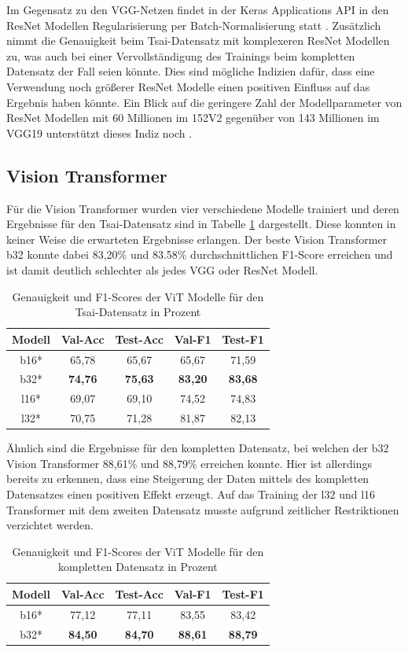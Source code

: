 \documentclass[twoside,a4paper]{IEEEtran}
\begin{document}
Im Gegensatz zu den VGG-Netzen findet in der Keras Applications API in den ResNet Modellen Regularisierung per Batch-Normalisierung statt \cite{resnet_keras}. Zusätzlich nimmt die Genauigkeit beim Tsai-Datensatz mit komplexeren ResNet Modellen zu, was auch bei einer Vervollständigung des Trainings beim kompletten Datensatz der Fall seien könnte. Dies sind mögliche Indizien dafür, dass eine Verwendung noch größerer ResNet Modelle einen positiven Einfluss auf das Ergebnis haben könnte. Ein Blick auf die geringere Zahl der Modellparameter von ResNet Modellen mit 60 Millionen im 152V2 gegenüber von 143 Millionen im VGG19 unterstützt dieses Indiz noch \cite{keras_app}.
\subsection{Vision Transformer}
Für die Vision Transformer wurden vier verschiedene Modelle trainiert und deren Ergebnisse für den Tsai-Datensatz sind in Tabelle \ref{vit_ergebnis_tsai} dargestellt. Diese konnten in keiner Weise die erwarteten Ergebnisse erlangen. Der beste Vision Transformer b32 konnte dabei 83,20\% und 83.58\% durchschnittlichen F1-Score erreichen und ist damit deutlich schlechter als jedes VGG oder ResNet Modell.
\begin{table}[!htb]
	\caption{Genauigkeit und F1-Scores der ViT Modelle für den Tsai-Datensatz in Prozent}
	\label{vit_ergebnis_tsai}
	\centering
	\begin{tabular}{|c|c|c|c|c|}
		\hline
		Modell & Val-Acc & Test-Acc & Val-F1 & Test-F1\\
		\hline
		\hline
		b16* & 65,78 & 65,67 & 65,67 & 71,59\\
		\hline
		b32* & \textbf{74,76} & \textbf{75,63} & \textbf{83,20} & \textbf{83,68}\\
		\hline
		l16* & 69,07 & 69,10 & 74,52 & 74,83\\
		\hline
		l32* & 70,75 & 71,28 & 81,87 & 82,13\\
		\hline 
	\end{tabular}
\end{table}

Ähnlich sind die Ergebnisse für den kompletten Datensatz, bei welchen der b32 Vision Transformer 88,61\% und 88,79\% erreichen konnte. Hier ist allerdings bereits zu erkennen, dass eine Steigerung der Daten mittels des kompletten Datensatzes einen positiven Effekt erzeugt. Auf das Training der l32 und l16 Transformer mit dem zweiten Datensatz musste aufgrund zeitlicher Restriktionen verzichtet werden.
\begin{table}[!htb]
	\caption{Genauigkeit und F1-Scores der ViT Modelle für den kompletten Datensatz in Prozent}
	\label{vit_ergebnis_full}
	\centering
	\begin{tabular}{|c|c|c|c|c|}
		\hline
		Modell & Val-Acc & Test-Acc & Val-F1 & Test-F1\\
		\hline
		\hline 
		b16* & 77,12 & 77,11 & 83,55 & 83,42\\
		\hline
		b32* & \textbf{84,50} & \textbf{84,70} & \textbf{88,61} & \textbf{88,79}\\
		\hline 
	\end{tabular}
\end{table}
\end{document}
